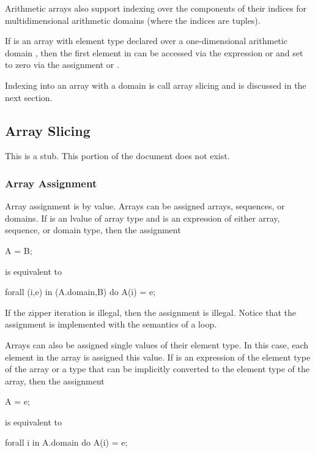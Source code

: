 Arithmetic arrays also support indexing over the components of their
indices for multidimensional arithmetic domains (where the indices are
tuples).

\begin{example}
If  is an array with element type  declared over a
one-dimensional arithmetic domain \chpl{[1..n, 1..n]}, then the first
element in  can be accessed via the expression 
or  and set to zero via the assignment  or .
\end{example}

Indexing into an array with a domain is call array slicing and is
discussed in the next section.

\subsection{Array Slicing}
\label{Array_Slicing}

This is a stub.  This portion of the document does not exist.

\subsubsection{Array Assignment}
\label{Array_Assignment}

Array assignment is by value.  Arrays can be assigned arrays,
sequences, or domains.  If  is an lvalue of array type
and  is an expression of either array, sequence, or domain
type, then the assignment
\begin{chapel}
A = B;
\end{chapel}
is equivalent to
\begin{chapel}
forall (i,e) in (A.domain,B) do
  A(i) = e;
\end{chapel}
If the zipper iteration is illegal, then the assignment is illegal.
Notice that the assignment is implemented with the semantics of
a  loop.

Arrays can also be assigned single values of their element type.  In
this case, each element in the array is assigned this value.
If  is an expression of the element type of the array or a
type that can be implicitly converted to the element type of the
array, then the assignment
\begin{chapel}
A = e;
\end{chapel}
is equivalent to
\begin{chapel}
forall i in A.domain do
  A(i) = e;
\end{chapel}


